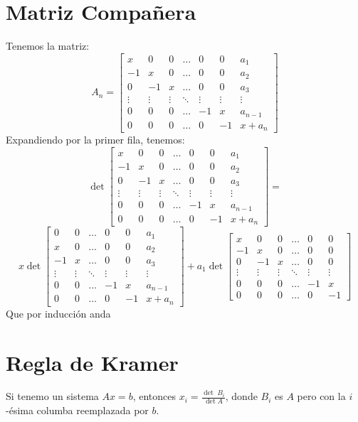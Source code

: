 \documentclass{article}
\begin{document}
\section*{Matriz Compañera}
Tenemos la matriz:
\[
	A_n = 
	\begin{bmatrix}
		x & 0 & 0 & \dots &0& 0& a_1 \\
		-1 & x & 0 & \dots &0& 0& a_2 \\
		0 & -1 & x & \dots &0&0& a_3 \\
		\vdots & \vdots & \vdots & \ddots &\vdots& \vdots& \vdots \\
		0 & 0 & 0 & \dots &-1& x & a_{n-1} \\
		0 & 0 & 0 & \dots &0& -1 & x+a_n
	\end{bmatrix}
\]
Expandiendo por la primer fila, tenemos:
\[
	\det
	\begin{bmatrix}
		x & 0 & 0 & \dots &0& 0& a_1 \\
		-1 & x & 0 & \dots &0& 0& a_2 \\
		0 & -1 & x & \dots &0&0& a_3 \\
		\vdots & \vdots & \vdots & \ddots &\vdots& \vdots& \vdots \\
		0 & 0 & 0 & \dots &-1& x & a_{n-1} \\
		0 & 0 & 0 & \dots &0& -1 & x+a_n
	\end{bmatrix} = 
\]
\[
	x\det
	\begin{bmatrix}
		0 & 0 & \dots &0& 0& a_1 \\
		x & 0 & \dots &0& 0& a_2 \\
		-1 & x & \dots &0&0& a_3 \\
		\vdots & \vdots & \ddots &\vdots& \vdots& \vdots \\
		0 & 0 & \dots &-1& x & a_{n-1} \\
		0 & 0 & \dots &0& -1 & x+a_n
	\end{bmatrix} + 
	a_1 \det\begin{bmatrix}
		x & 0 & 0 & \dots &0& 0\\
		-1 & x & 0 & \dots &0& 0 \\
		0 & -1 & x & \dots &0&0 \\
		\vdots & \vdots & \vdots & \ddots &\vdots& \vdots \\
		0 & 0 & 0 & \dots &-1& x  \\
		0 & 0 & 0 & \dots &0& -1 
	\end{bmatrix}
\]
Que por inducción anda

\section*{Regla de Kramer}
Si tenemo un sistema $Ax = b$, entonces $x_i = \frac{\det \; B_i}{\det A}$, donde $B_i$ es $A$ pero con la $i$-ésima columba reemplazada por $b$.
\end{document}
